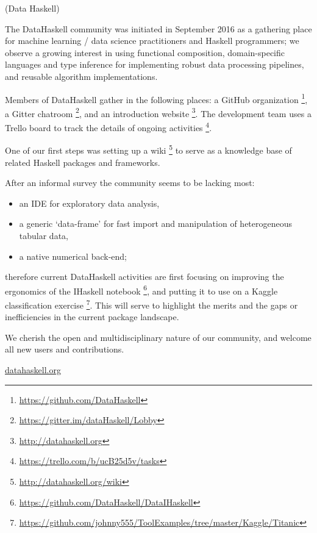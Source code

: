 \documentclass[DIV16,twocolumn,10pt]{scrreprt}
\begin{document}
\begin{hcarentry}{(Data Haskell)}
\makeheader

The DataHaskell community was initiated in September 2016 as a gathering place for machine learning / data science practitioners and Haskell programmers; we observe a growing interest in using functional composition, domain-specific languages and type inference for implementing robust data processing pipelines, and reusable algorithm implementations.


Members of DataHaskell gather in the following places: a GitHub organization \footnote{\url{https://github.com/DataHaskell}}, a Gitter chatroom \footnote{\url{https://gitter.im/dataHaskell/Lobby}}, and an introduction website \footnote{\url{http://datahaskell.org}}. The development team uses a Trello board to track the details of ongoing activities \footnote{\url{https://trello.com/b/ucB25d5v/tasks}}.

One of our first steps was setting up a wiki \footnote{\url{http://datahaskell.org/wiki}} to serve as a knowledge base of related Haskell packages and frameworks.

After an informal survey the community seems to be lacking most:
\begin{itemize} 
\item an IDE for exploratory data analysis,
\item a generic `data-frame' for fast import and manipulation of heterogeneous tabular data,
\item a native numerical back-end;
\end{itemize}
therefore current DataHaskell activities are first focusing on improving the ergonomics of the IHaskell notebook \footnote{\url{https://github.com/DataHaskell/DataIHaskell}}, and putting it to use on a Kaggle classification exercise \footnote{\url{https://github.com/johnny555/ToolExamples/tree/master/Kaggle/Titanic}}. This will serve to highlight the merits and the gaps or inefficiencies in the current package landscape.

We cherish the open and multidisciplinary nature of our community, and welcome all new users and contributions.

\FurtherReading
  \url{datahaskell.org}
\end{hcarentry}
\end{document}
